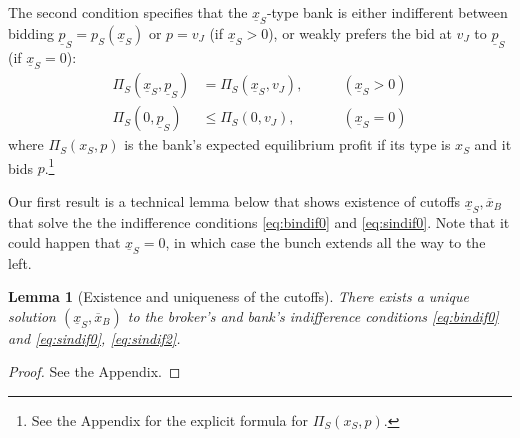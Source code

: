 \documentclass[11pt,twopage]{article}
\newcommand{\ol}{\overline}
\newcommand{\ul}{\underline}
\newtheorem{lemma}{Lemma}
{\bf}{\it}
\begin{document}
The second condition specifies that the $\underline x_S$-type bank is
either indifferent between bidding $\underline p_S = p_S(\ul x_S)$ or
$p=v_J$ (if $\underline x_S > 0$), or weakly prefers the bid at $v_J$
to $\underline p_S$ (if $\underline x_S = 0$):
\begin{align}
  \Pi_S(\underline x_S,\underline p_S) &= \Pi_S(\underline
  x_S,v_J),\quad\quad & (\underline x_S > 0)
  \label{eq:sindif0}
  \\
  \Pi_S(0,\underline p_S) &\leq \Pi_S (0, v_J), \quad\quad &
  (\underline x_S = 0) \label{eq:sindif2}
\end{align}
where $\Pi_S(x_S,p)$ is the bank's expected equilibrium profit if its
type is $x_S$ and it bids $p$.\footnote{See the Appendix for the
  explicit formula for $ \Pi_S(x_S,p)$.}

Our first result is a technical lemma below that shows existence of
cutoffs $\underline x_S, \ol x_B$ that solve the the indifference
conditions \eqref{eq:bindif0} and \eqref{eq:sindif0}. Note that it
could happen that $\ul x_S = 0$, in which case the bunch extends all
the way to the left.
\begin{lemma}[Existence and uniqueness of the
  cutoffs]\label{lm:cutoffs}
  There exists a unique solution $(\underline x_S, \ol x_B)$ to the
  broker's and bank's indifference conditions \eqref{eq:bindif0} and
  \eqref{eq:sindif0}, \eqref{eq:sindif2}.
\end{lemma}
\begin{proof}See the Appendix.\end{proof}
\end{document}
